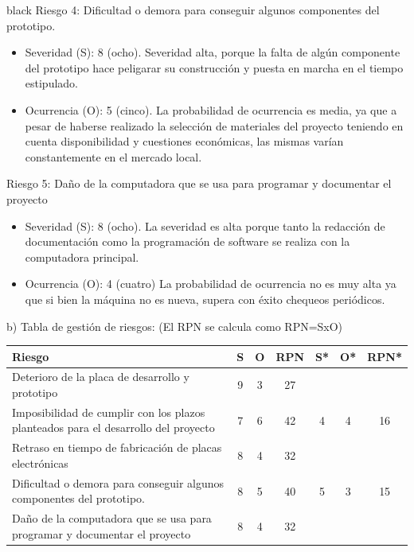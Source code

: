 \documentclass[11pt]{charter}
\begin{document}
\begin{consigna}{black}
Riesgo 4: Dificultad o demora para conseguir algunos componentes del prototipo.
\begin{itemize}
\item Severidad (S): 8 (ocho).
Severidad alta, porque la falta de algún componente del prototipo hace peligarar su construcción y puesta en marcha en el tiempo estipulado.
\item Ocurrencia (O): 5 (cinco).
La probabilidad de ocurrencia es media, ya que a pesar de haberse realizado la selección de materiales del proyecto teniendo en cuenta disponibilidad y cuestiones económicas, las mismas varían constantemente en el mercado local. 
\end{itemize}

Riesgo 5: Daño de la computadora que se usa para programar y documentar el proyecto
\begin{itemize}
\item Severidad (S): 8 (ocho).
La severidad es alta porque tanto la redacción de documentación como la programación de software se realiza con la computadora principal.
\item Ocurrencia (O): 4 (cuatro)
La probabilidad de ocurrencia no es muy alta ya que si bien la máquina no es nueva, supera con éxito chequeos periódicos.
\end{itemize}

b) Tabla de gestión de riesgos:      (El RPN se calcula como RPN=SxO)

\begin{table}[htpb]
\centering
\begin{tabularx}{\linewidth}{@{}|X|c|c|c|c|c|c|@{}}
\hline
\rowcolor[HTML]{C0C0C0} 
Riesgo & S & O & RPN & S* & O* & RPN* \\ \hline
Deterioro de la placa de desarrollo y prototipo    &  9 & 3  & \cellcolor{green}27    &    &    &      \\ \hline
Imposibilidad de cumplir con los plazos planteados para el desarrollo del proyecto   & 7  & 6  & \cellcolor{red}42    & 4  & 4   & \cellcolor{green}16     \\ \hline
Retraso en tiempo de fabricación de placas electrónicas       & 8 & 4  & \cellcolor{green} 32    &    &    &      \\ \hline
Dificultad o demora para conseguir algunos componentes del prototipo. & 8 & 5 & \cellcolor{red}40   & 5 & 3   & \cellcolor{green}15      \\ \hline
Daño de la computadora que se usa para programar y documentar el proyecto & 8  & 4  &    \cellcolor{green} 32 &    &    &      \\ \hline
\end{tabularx}%
\end{table}


\end{consigna}
\end{document}
